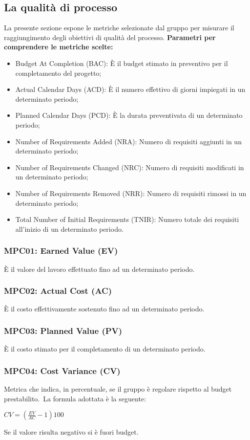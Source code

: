 \subsection{La qualità di processo}
La presente sezione espone le metriche selezionate dal gruppo \groupName{} per misurare il raggiungimento degli obiettivi di qualità del processo.
\textbf{Parametri per comprendere le metriche scelte:}
\begin{itemize}
    \item Budget At Completion (BAC): È il budget stimato in preventivo per il completamento del progetto;
    \item Actual Calendar Days (ACD): È il numero effettivo di giorni impiegati in un determinato periodo;
    \item Planned Calendar Days (PCD): È la durata preventivata di un determinato periodo;
    \item Number of Requirements Added (NRA): Numero di requisiti aggiunti in un determinato periodo;
    \item Number of Requirements Changed (NRC): Numero di requisiti modificati in un determinato periodo;
    \item Number of Requirements Removed (NRR): Numero di requisiti rimossi in un determinato periodo;
    \item Total Number of Initial Requirements (TNIR): Numero totale dei requisiti all'inizio di un determinato periodo.
\end{itemize}

\subsubsection{MPC01: Earned Value (EV)}\label{sssec:earned_value}
È il valore del lavoro effettuato fino ad un determinato periodo.

\subsubsection{MPC02: Actual Cost (AC)}\label{sssec:actual_cost}
È il costo effettivamente sostenuto fino ad un determinato periodo.

\subsubsection{MPC03: Planned Value (PV)}\label{sssec:planned_value}
È il costo stimato per il completamento di un determinato periodo.

\subsubsection{MPC04: Cost Variance (CV)}\label{sssec:cost_variance}
Metrica che indica, in percentuale, se il gruppo è regolare rispetto al budget prestabilito.\
La formula adottata è la seguente:
\begin{center}
    $CV = \displaystyle (\frac{EV}{AC}-1)100$
\end{center}
Se il valore risulta negativo si è fuori budget.
